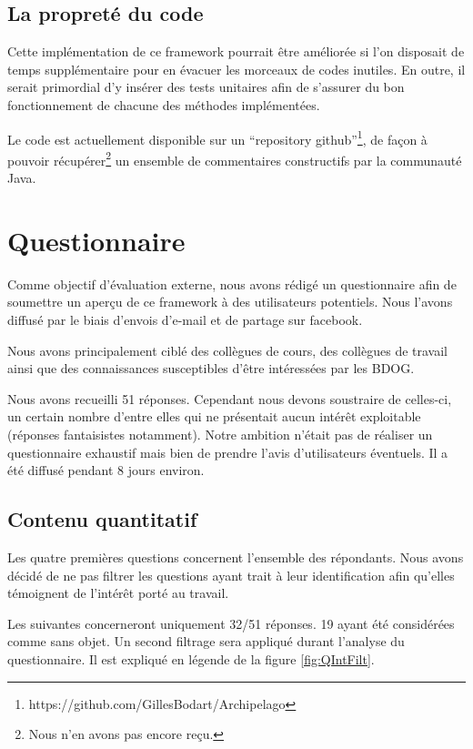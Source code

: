 \documentclass[a4paper,fleqn,12pt,oneside]{report}
\begin{document}
\subsection{La propreté du code}

Cette implémentation de ce framework pourrait être améliorée si l'on disposait de temps supplémentaire pour en évacuer les morceaux de codes inutiles. En outre, il serait primordial d'y insérer des tests unitaires afin de s'assurer du bon fonctionnement de chacune des méthodes implémentées.

Le code est actuellement disponible sur un \enquote{repository github}\footnote{https://github.com/GillesBodart/Archipelago}, de façon à pouvoir récupérer\footnote{Nous n'en avons pas encore reçu.} un ensemble de commentaires constructifs par la communauté Java. 

\section{Questionnaire}

Comme objectif d'évaluation externe, nous avons rédigé un questionnaire afin de soumettre un aperçu de ce framework à des utilisateurs potentiels. Nous l'avons diffusé par le biais d'envois d'e-mail et de partage sur facebook.

Nous avons principalement ciblé des collègues de cours, des collègues de travail ainsi que des connaissances susceptibles d'être intéressées par les BDOG.

Nous avons recueilli 51 réponses. Cependant nous devons soustraire de celles-ci, un certain nombre d'entre elles qui ne présentait aucun intérêt exploitable (réponses fantaisistes notamment). Notre ambition n'était pas de réaliser un questionnaire exhaustif mais bien de prendre l'avis d'utilisateurs éventuels. Il a été diffusé pendant 8 jours environ.


\subsection{Contenu quantitatif}

Les quatre premières questions concernent l'ensemble des répondants. Nous avons décidé de ne pas filtrer les questions ayant trait à leur identification afin qu'elles témoignent de l'intérêt porté au travail.

Les suivantes concerneront uniquement 32/51 réponses. 19 ayant été considérées comme sans objet. Un second filtrage sera appliqué durant l'analyse du questionnaire. Il est expliqué en légende de la figure \ref{fig:QIntFilt}.
\end{document}
